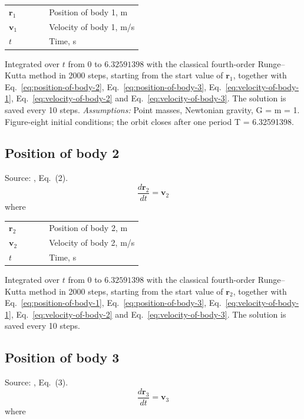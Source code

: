 \noindent\begin{tabular}{@{\quad}l@{\quad}p{0.7\linewidth}@{}}
  $\mathbf{r}_1$ & Position of body 1, \si{m} \\
  $\mathbf{v}_1$ & Velocity of body 1, \si{m/s} \\
  $t$ & Time, \si{s} \\
\end{tabular}

\noindent Integrated over $t$ from $0$ to $6.32591398$ with the classical fourth-order Runge–Kutta method in 2000 steps, starting from the start value of $\mathbf{r}_1$, together with Eq.~\eqref{eq:position-of-body-2}, Eq.~\eqref{eq:position-of-body-3}, Eq.~\eqref{eq:velocity-of-body-1}, Eq.~\eqref{eq:velocity-of-body-2} and Eq.~\eqref{eq:velocity-of-body-3}. The solution is saved every 10 steps. \textit{Assumptions:} Point masses, Newtonian gravity, G = m = 1. Figure-eight initial conditions; the orbit closes after one period T = 6.32591398.

\subsection{Position of body 2}
Source: \cite{chenciner2000}, Eq.~(2).
\begin{equation}
  \frac{d\mathbf{r}_2}{dt} = \mathbf{v}_2
  \label{eq:position-of-body-2}
\end{equation}
\noindent where

\noindent\begin{tabular}{@{\quad}l@{\quad}p{0.7\linewidth}@{}}
  $\mathbf{r}_2$ & Position of body 2, \si{m} \\
  $\mathbf{v}_2$ & Velocity of body 2, \si{m/s} \\
  $t$ & Time, \si{s} \\
\end{tabular}

\noindent Integrated over $t$ from $0$ to $6.32591398$ with the classical fourth-order Runge–Kutta method in 2000 steps, starting from the start value of $\mathbf{r}_2$, together with Eq.~\eqref{eq:position-of-body-1}, Eq.~\eqref{eq:position-of-body-3}, Eq.~\eqref{eq:velocity-of-body-1}, Eq.~\eqref{eq:velocity-of-body-2} and Eq.~\eqref{eq:velocity-of-body-3}. The solution is saved every 10 steps.

\subsection{Position of body 3}
Source: \cite{chenciner2000}, Eq.~(3).
\begin{equation}
  \frac{d\mathbf{r}_3}{dt} = \mathbf{v}_3
  \label{eq:position-of-body-3}
\end{equation}
\noindent where

